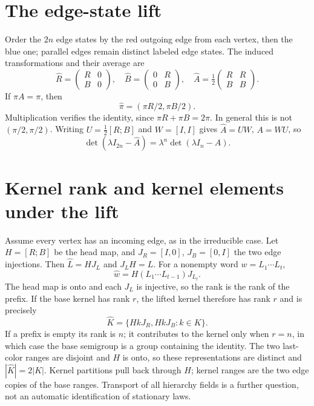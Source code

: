 \section{The edge-state lift}
\label{organized:double-core}

Order the $2n$ edge states by the red outgoing edge from each vertex,
then the blue one; parallel edges remain distinct labeled edge states.
The induced transformations and their average are
\[
 \widehat R=\begin{pmatrix}R&0\\B&0\end{pmatrix},\quad
 \widehat B=\begin{pmatrix}0&R\\0&B\end{pmatrix},\quad
 \widehat A=\tfrac12\begin{pmatrix}R&R\\B&B\end{pmatrix}.
\]
If $\pi A=\pi$, then
\[
 \widehat\pi=(\pi R/2,\pi B/2).
\]
Multiplication verifies the identity, since $\pi R+\pi B=2\pi$.
In general this is not $(\pi/2,\pi/2)$.
Writing $U=\tfrac12[R;B]$ and $W=[I,I]$ gives $\widehat A=UW$,
$A=WU$, so
\[
 \det(\lambda I_{2n}-\widehat A)=\lambda^n\det(\lambda I_n-A).
\]

\section{Kernel rank and kernel elements under the lift}
Assume every vertex has an incoming edge, as in the irreducible case.
Let $H=[R;B]$ be the head map, and $J_R=[I,0]$, $J_B=[0,I]$ the two
edge injections. Then $\widehat L=HJ_L$ and $J_LH=L$.
For a nonempty word $w=L_1\cdots L_t$,
\[
 \widehat w=H(L_1\cdots L_{t-1})J_{L_t}.
\]
The head map is onto and each $J_L$ is injective, so the rank is the
rank of the prefix. If the base kernel has rank $r$, the lifted kernel
therefore has rank $r$ and is precisely
\[
 \widehat K=\{HkJ_R,HkJ_B:k\in K\}.
\]
If a prefix is empty its rank is $n$; it contributes to the kernel only
when $r=n$, in which case the base semigroup is a group containing the
identity. The two last-color ranges are disjoint and $H$ is onto, so
these representations are distinct and $|\widehat K|=2|K|$.
Kernel partitions pull back through $H$; kernel ranges are the two edge
copies of the base ranges. Transport of all hierarchy fields is a
further question, not an automatic identification of stationary laws.

